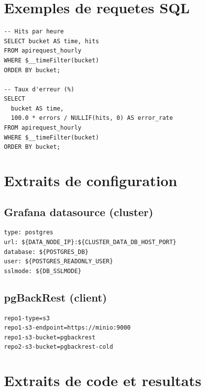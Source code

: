 \section{Exemples de requetes SQL}
\begin{verbatim}
-- Hits par heure
SELECT bucket AS time, hits
FROM apirequest_hourly
WHERE $__timeFilter(bucket)
ORDER BY bucket;

-- Taux d'erreur (%)
SELECT
  bucket AS time,
  100.0 * errors / NULLIF(hits, 0) AS error_rate
FROM apirequest_hourly
WHERE $__timeFilter(bucket)
ORDER BY bucket;
\end{verbatim}

\section{Extraits de configuration}
\subsection*{Grafana datasource (cluster)}
\begin{verbatim}
type: postgres
url: ${DATA_NODE_IP}:${CLUSTER_DATA_DB_HOST_PORT}
database: ${POSTGRES_DB}
user: ${POSTGRES_READONLY_USER}
sslmode: ${DB_SSLMODE}
\end{verbatim}

\subsection*{pgBackRest (client)}
\begin{verbatim}
repo1-type=s3
repo1-s3-endpoint=https://minio:9000
repo1-s3-bucket=pgbackrest
repo2-s3-bucket=pgbackrest-cold
\end{verbatim}

\section{Extraits de code et resultats}
